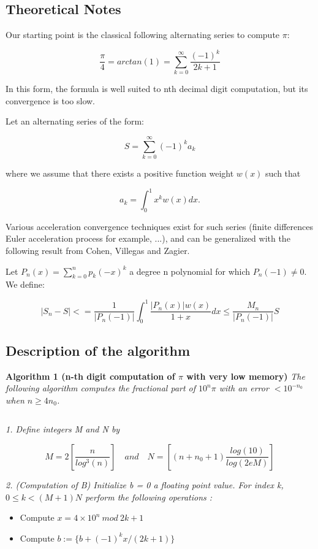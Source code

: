 \documentclass[a4paper, 12pt]{article}
\begin{document}
\subsection{Theoretical Notes}

Our starting point is the classical following alternating series to compute $\pi$:

\[ \frac{\pi}{4} = arctan(1) = \sum_{k=0}^{\infty}\frac{(-1)^k}{2k+1} \]

In this form, the formula is well suited to nth decimal digit computation, but its convergence
is too slow.

Let an alternating series of the form:

\[ S = \sum_{k=0}^{\infty} (-1)^k a_k \]

where we assume that there exists a positive function weight $w(x)$ such that

\[ a_k = \int_0^1 x^k w(x) dx. \]

Various acceleration convergence techniques exist for such series (finite differences Euler acceleration process for example, ...), and can be generalized with the following result from Cohen,
Villegas and Zagier.

Let $ P_n(x) = \sum_{k=0}^n p_k(-x)^k $  a degree n polynomial for which $ P_n(-1) \neq 0 $. We define:

\[ |S_n-S| <= \frac{1}{|P_n(-1)|}\int_0^1 \frac{|P_n(x)|w(x)}{1+x} dx \leq \frac{M_n}{|P_n(-1)|}S \]

\newpage

\subsection{Description of the algorithm}

\textbf{Algorithm 1 (n-th digit computation of $\pi$ with very low memory)} \textit{The following algorithm
    computes the fractional part of $10^n\pi$ with an error $< 10^{-n_0}$ when $n \geq 4n_0$.}

$$$$

\textit{1. Define integers M and N by}

$$
    M = 2 \left[\frac{n}{log^3(n)}\right] \quad and \quad N = \left[(n+n_0+1)\frac{log(10)}{log(2eM)}\right]
$$

\textit{2. (Computation of B) Initialize b = 0 a floating point value. For index k, $0 \leq k < (M + 1)N$ perform the following operations :}

\begin{itemize}
    \item Compute $x = 4 \times 10^n \ mod \ 2k+1$
    \item Compute $b := \{b+(-1)^kx/(2k+1)\}$
\end{itemize}
\end{document}
